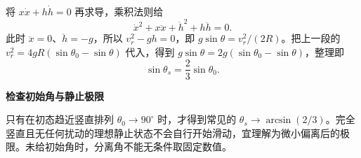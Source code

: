 \begin{solution}
将 $x\dot x+h\dot h=0$ 再求导，乘积法则给
\[
\dot x^2+x\ddot x+\dot h^2+h\ddot h=0.
\]
此时 $\ddot x=0$、$\ddot h=-g$，所以 $v_r^2-gh=0$，即 $g\sin\theta=v_r^2/(2R)$。把上一段的 $v_r^2=4gR(\sin\theta_0-\sin\theta)$ 代入，得到 $g\sin\theta=2g(\sin\theta_0-\sin\theta)$，整理即
\[\sin\theta_s=\frac23\sin\theta_0.\]


\par\medskip{}\noindent\textbf{检查初始角与静止极限}\par\nobreak
只有在初态趋近竖直排列 $\theta_0\to90^\circ$ 时，才得到常见的 $\theta_s\to\arcsin(2/3)$。完全竖直且无任何扰动的理想静止状态不会自行开始滑动，宜理解为微小偏离后的极限。未给初始角时，分离角不能无条件取固定数值。

\end{solution}


